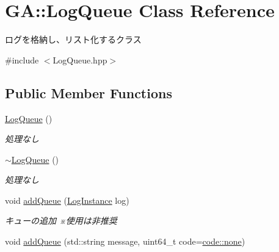 \hypertarget{class_g_a_1_1_log_queue}{}\section{GA\+::Log\+Queue Class Reference}
\label{class_g_a_1_1_log_queue}


ログを格納し、リスト化するクラス  




{\ttfamily \#include $<$Log\+Queue.\+hpp$>$}

\subsection*{Public Member Functions}
\begin{DoxyCompactItemize}
\item 
\mbox{\label{class_g_a_1_1_log_queue_ad4979dd25639f650a9428348b58dd905}} 
\mbox{\hyperlink{class_g_a_1_1_log_queue_ad4979dd25639f650a9428348b58dd905}{Log\+Queue}} ()
\begin{DoxyCompactList}\small\item\em 処理なし \end{DoxyCompactList}\item 
\mbox{\label{class_g_a_1_1_log_queue_a9c28fe6efd218c251a2f24c7128c07b8}} 
\mbox{\hyperlink{class_g_a_1_1_log_queue_a9c28fe6efd218c251a2f24c7128c07b8}{$\sim$\+Log\+Queue}} ()
\begin{DoxyCompactList}\small\item\em 処理なし \end{DoxyCompactList}\item 
\mbox{\label{class_g_a_1_1_log_queue_a41e2a1bfa8a944dda376eedb32894f1a}} 
void \mbox{\hyperlink{class_g_a_1_1_log_queue_a41e2a1bfa8a944dda376eedb32894f1a}{add\+Queue}} (\mbox{\hyperlink{class_g_a_1_1_log_instance}{Log\+Instance}} log)
\begin{DoxyCompactList}\small\item\em キューの追加 ※使用は非推奨 \end{DoxyCompactList}\item 
\mbox{\label{class_g_a_1_1_log_queue_a4a2330d09a59be8e8af5c9185fd7557e}} 
void \mbox{\hyperlink{class_g_a_1_1_log_queue_a4a2330d09a59be8e8af5c9185fd7557e}{add\+Queue}} (std\+::string message, uint64\+\_\+t code=\mbox{\hyperlink{namespace_g_a_1_1code_af8cbb1bc81d68690746249ddbf4a238a}{code\+::none}})

\end{DoxyCompactItemize}
